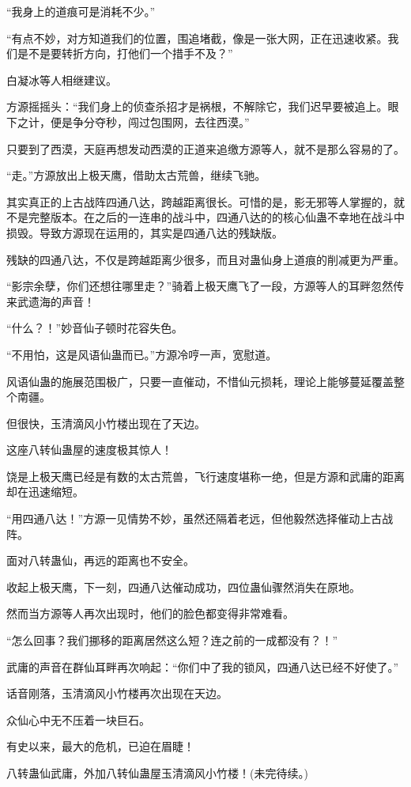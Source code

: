 \begin{this_body}
“我身上的道痕可是消耗不少。”

“有点不妙，对方知道我们的位置，围追堵截，像是一张大网，正在迅速收紧。我们是不是要转折方向，打他们一个措手不及？”

白凝冰等人相继建议。

方源摇摇头：“我们身上的侦查杀招才是祸根，不解除它，我们迟早要被追上。眼下之计，便是争分夺秒，闯过包围网，去往西漠。”

只要到了西漠，天庭再想发动西漠的正道来追缴方源等人，就不是那么容易的了。

“走。”方源放出上极天鹰，借助太古荒兽，继续飞驰。

其实真正的上古战阵四通八达，跨越距离很长。可惜的是，影无邪等人掌握的，就不是完整版本。在之后的一连串的战斗中，四通八达的的核心仙蛊不幸地在战斗中损毁。导致方源现在运用的，其实是四通八达的残缺版。

残缺的四通八达，不仅是跨越距离少很多，而且对蛊仙身上道痕的削减更为严重。

“影宗余孽，你们还想往哪里走？”骑着上极天鹰飞了一段，方源等人的耳畔忽然传来武遗海的声音！

“什么？！”妙音仙子顿时花容失色。

“不用怕，这是风语仙蛊而已。”方源冷哼一声，宽慰道。

风语仙蛊的施展范围极广，只要一直催动，不惜仙元损耗，理论上能够蔓延覆盖整个南疆。

但很快，玉清滴风小竹楼出现在了天边。

这座八转仙蛊屋的速度极其惊人！

饶是上极天鹰已经是有数的太古荒兽，飞行速度堪称一绝，但是方源和武庸的距离却在迅速缩短。

“用四通八达！”方源一见情势不妙，虽然还隔着老远，但他毅然选择催动上古战阵。

面对八转蛊仙，再远的距离也不安全。

收起上极天鹰，下一刻，四通八达催动成功，四位蛊仙骤然消失在原地。

然而当方源等人再次出现时，他们的脸色都变得非常难看。

“怎么回事？我们挪移的距离居然这么短？连之前的一成都没有？！”

武庸的声音在群仙耳畔再次响起：“你们中了我的锁风，四通八达已经不好使了。”

话音刚落，玉清滴风小竹楼再次出现在天边。

众仙心中无不压着一块巨石。

有史以来，最大的危机，已迫在眉睫！

八转蛊仙武庸，外加八转仙蛊屋玉清滴风小竹楼！(未完待续。)

\end{this_body}

